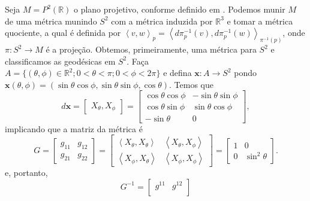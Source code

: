 \begin{example}
    \label{ex:geodesicas}
    Seja $M=P^{2}(\mathbb{R})$ o plano projetivo, conforme definido em \textcite{doCarmo1992}. Podemos munir $M$ de uma métrica munindo $S^{2}$ com a métrica induzida por $\mathbb{R}^{3}$ e tomar a métrica quociente, a qual é definida por $\left< v,w \right>_{p}=\left< d\pi ^{-1}_{p}(v),d\pi ^{-1}_{p}(w) \right>_{\pi ^{-1}(p)}$, onde $\pi:S^{2}\to M$ é a projeção.
    Obtemos, primeiramente, uma métrica para $S^{2}$ e classificamos as geodésicas em $S^{2}$. Faça $A=\{ (\theta,\phi)\in \mathbb{R}^{2}; 0<\theta<\pi; 0<\phi<2\pi \}$ e defina $\mathbf{x}:A\to S^{2}$ pondo $\mathbf{x}(\theta,\phi)=(\sin \theta \cos \phi,\sin \theta\sin \phi,\cos \theta)$.
    Temos que
    \begin{equation*}
        d\mathbf{x}= \begin{bmatrix}
            X_{\theta}, X_{\phi}
        \end{bmatrix}
        =\begin{bmatrix}
            \cos \theta \cos \phi & -\sin \theta \sin \phi \\
            \cos \theta \sin \phi & \sin \theta \cos \phi  \\
            -\sin \theta          & 0
        \end{bmatrix},
    \end{equation*}
    implicando que a matriz da métrica é
    \begin{equation*}
        G=\begin{bmatrix}
            g_{11} & g_{12} \\
            g_{21} & g_{22}
        \end{bmatrix}
        = \begin{bmatrix}
            \left< X_{\theta},X_{\theta} \right> & \left< X_{\theta},X_{\phi} \right> \\
            \left< X_{\phi},X_{\theta} \right>   & \left< X_{\phi},X_{\phi} \right>
        \end{bmatrix}
        = \begin{bmatrix}
            1 & 0               \\
            0 & \sin ^{2}\theta
        \end{bmatrix}.
    \end{equation*}
    e, portanto,
    \begin{equation*}
        G^{-1}=\begin{bmatrix}
            g^{11} & g^{12} \\

\end{bmatrix}
\end{equation*}
\end{example}
